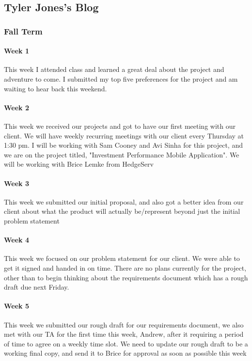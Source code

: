 \documentclass[onecolumn, draftclsnofoot,10pt, compsoc]{IEEEtran}
\begin{document}
\subsection{Tyler Jones's Blog}
\subsubsection{Fall Term}
\paragraph{Week 1}
This week I attended class and learned a great deal about the project and adventure to come. I submitted my top five preferences for the project and am waiting to hear back this weekend.
\paragraph{Week 2}
This week we received our projects and got to have our first meeting with our client. We will have weekly recurring meetings with our client every Thursday at 1:30 pm. I will be working with Sam Cooney and Avi Sinha for this project, and we are on the project titled, "Investment Performance Mobile Application". We will be working with Brice Lemke from HedgeServ
\paragraph{Week 3}
This week we submitted our initial proposal, and also got a better idea from our client about what the product will actually be/represent beyond just the initial problem statement 
\paragraph{Week 4}
This week we focused on our problem statement for our client. We were able to get it signed and handed in on time. There are no plans currently for the project, other than to begin thinking about the requirements document which has a rough draft due next Friday. 
\paragraph{Week 5}
This week we submitted our rough draft for our requirements document, we also met with our TA for the first time this week, Andrew, after it requiring a period of time to agree on a weekly time slot. We need to update our rough draft to be a working final copy, and send it to Brice for approval as soon as possible this week 
\end{document}
